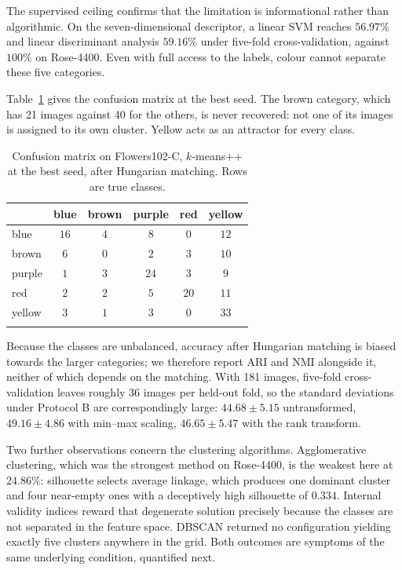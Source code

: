 \documentclass[pdflatex,sn-basic]{sn-jnl}
\theoremstyle{thmstyleone}%
\theoremstyle{thmstyletwo}%
\theoremstyle{thmstylethree}%
\begin{document}
The supervised ceiling confirms that the limitation is informational rather
than algorithmic. On the seven-dimensional descriptor, a linear SVM reaches
$56.97\%$ and linear discriminant analysis $59.16\%$ under five-fold
cross-validation, against $100\%$ on Rose-4400. Even with full access to the
labels, colour cannot separate these five categories.

Table~\ref{tab:flowers-confusion} gives the confusion matrix at the best seed.
The brown category, which has 21 images against 40 for the others, is never
recovered: not one of its images is assigned to its own cluster. Yellow acts as
an attractor for every class.

\begin{table}[h]
\centering
\caption{Confusion matrix on Flowers102-C, $k$-means++ at the best seed, after
Hungarian matching. Rows are true classes.}\label{tab:flowers-confusion}
\begin{tabular}{@{}lccccc@{}}
\toprule
 & blue & brown & purple & red & yellow \\
\midrule
blue   & $16$ & $4$ & $8$  & $0$  & $12$ \\
brown  & $6$  & $0$ & $2$  & $3$  & $10$ \\
purple & $1$  & $3$ & $24$ & $3$  & $9$ \\
red    & $2$  & $2$ & $5$  & $20$ & $11$ \\
yellow & $3$  & $1$ & $3$  & $0$  & $33$ \\
\botrule
\end{tabular}
\end{table}

Because the classes are unbalanced, accuracy after Hungarian matching is biased
towards the larger categories; we therefore report ARI and NMI alongside it,
neither of which depends on the matching. With 181 images, five-fold
cross-validation leaves roughly 36 images per held-out fold, so the standard
deviations under Protocol B are correspondingly large: $44.68\pm5.15$
untransformed, $49.16\pm4.86$ with min--max scaling, $46.65\pm5.47$ with the
rank transform.

Two further observations concern the clustering algorithms. Agglomerative
clustering, which was the strongest method on Rose-4400, is the weakest here at
$24.86\%$: silhouette selects average linkage, which produces one dominant
cluster and four near-empty ones with a deceptively high silhouette of $0.334$.
Internal validity indices reward that degenerate solution precisely because the
classes are not separated in the feature space. DBSCAN returned no
configuration yielding exactly five clusters anywhere in the grid. Both
outcomes are symptoms of the same underlying condition, quantified next.
\end{document}
